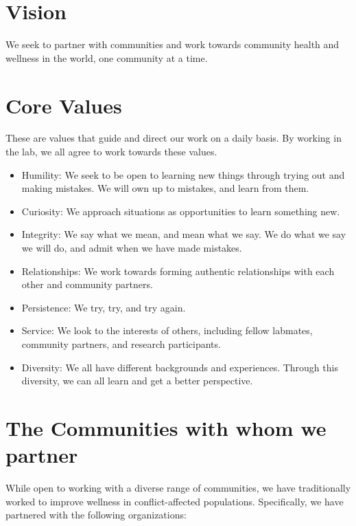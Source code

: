 \documentclass[
]{book}
\begin{document}
\hypertarget{vision}{%
\section{Vision}\label{vision}}

We seek to partner with communities and work towards community health and wellness in the world, one community at a time.

\hypertarget{core-values}{%
\section{Core Values}\label{core-values}}

These are values that guide and direct our work on a daily basis. By working in the lab, we all agree to work towards these values.

\begin{itemize}
\item
  Humility: We seek to be open to learning new things through trying out and making mistakes. We will own up to mistakes, and learn from them.
\item
  Curiosity: We approach situations as opportunities to learn something new.
\item
  Integrity: We say what we mean, and mean what we say. We do what we say we will do, and admit when we have made mistakes.
\item
  Relationships: We work towards forming authentic relationships with each other and community partners.
\item
  Persistence: We try, try, and try again.
\item
  Service: We look to the interests of others, including fellow labmates, community partners, and research participants.
\item
  Diversity: We all have different backgrounds and experiences. Through this diversity, we can all learn and get a better perspective.
\end{itemize}

\hypertarget{the-communities-with-whom-we-partner}{%
\section{The Communities with whom we partner}\label{the-communities-with-whom-we-partner}}

While open to working with a diverse range of communities, we have traditionally worked to improve wellness in conflict-affected populations. Specifically, we have partnered with the following organizations:
\end{document}

